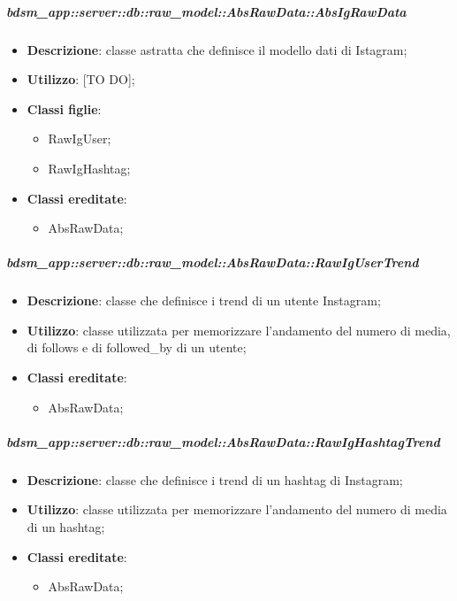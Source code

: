 				\subparagraph{bdsm\_app::server::db::raw\_model::AbsRawData::AbsIgRawData} %
			\label{subp:bdsm_app_server_raw_model_AbsRawData_AbsIgRawData}
				\begin{itemize}
					\item \textbf{Descrizione}: classe astratta che definisce il modello dati di Istagram;
					\item \textbf{Utilizzo}: [TO DO];
					\item \textbf{Classi figlie}:
					\begin{itemize}
						\item RawIgUser;
						\item RawIgHashtag;		
					\end{itemize}
					\item \textbf{Classi ereditate}:
					\begin{itemize}
						\item AbsRawData;
					\end{itemize}
				\end{itemize}
					\subparagraph{bdsm\_app::server::db::raw\_model::AbsRawData::RawIgUserTrend} %
			\label{subp:bdsm_app_server_raw_model_AbsRawData_RawIgUserTrend}
				\begin{itemize}
					\item \textbf{Descrizione}: classe che definisce i trend di un utente Instagram;
					\item \textbf{Utilizzo}: classe utilizzata per memorizzare l'andamento del numero di media, di follows e di followed\_by di un utente;
					\item \textbf{Classi ereditate}:
					\begin{itemize}
						\item AbsRawData;
					\end{itemize}
				\end{itemize}
			\subparagraph{bdsm\_app::server::db::raw\_model::AbsRawData::RawIgHashtagTrend} %
			\label{subp:bdsm_app_server_raw_model_AbsRawData_RawIgHashtagTrend}
				\begin{itemize}
					\item \textbf{Descrizione}: classe che definisce i trend di un hashtag di Instagram;
					\item \textbf{Utilizzo}: classe utilizzata per memorizzare l'andamento del numero di media di un hashtag;
					\item \textbf{Classi ereditate}:
					\begin{itemize}
						\item AbsRawData;
					\end{itemize}
				\end{itemize}
				
